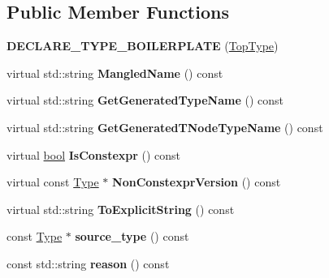 \subsection*{Public Member Functions}
\begin{DoxyCompactItemize}
\item 
\mbox{\label{classv8_1_1internal_1_1torque_1_1TopType_a4ab4da784464f2c3f13d1b2fa3656a39}} 
{\bfseries D\+E\+C\+L\+A\+R\+E\+\_\+\+T\+Y\+P\+E\+\_\+\+B\+O\+I\+L\+E\+R\+P\+L\+A\+TE} (\mbox{\hyperlink{classv8_1_1internal_1_1torque_1_1TopType}{Top\+Type}})
\item 
\mbox{\label{classv8_1_1internal_1_1torque_1_1TopType_afe6294e4d7bbfb9752502ddfdd43e6ba}} 
virtual std\+::string {\bfseries Mangled\+Name} () const
\item 
\mbox{\label{classv8_1_1internal_1_1torque_1_1TopType_a213c2f6aaedd82b1d601ed5eb48e16ab}} 
virtual std\+::string {\bfseries Get\+Generated\+Type\+Name} () const
\item 
\mbox{\label{classv8_1_1internal_1_1torque_1_1TopType_a12a04aa070d234950b048692e69a19a6}} 
virtual std\+::string {\bfseries Get\+Generated\+T\+Node\+Type\+Name} () const
\item 
\mbox{\label{classv8_1_1internal_1_1torque_1_1TopType_ad7fa159e3058bbfd616c14861a0f6600}} 
virtual \mbox{\hyperlink{classbool}{bool}} {\bfseries Is\+Constexpr} () const
\item 
\mbox{\label{classv8_1_1internal_1_1torque_1_1TopType_a2cf5c51e6e53fbb5142623a992dc127f}} 
virtual const \mbox{\hyperlink{classv8_1_1internal_1_1torque_1_1Type}{Type}} $\ast$ {\bfseries Non\+Constexpr\+Version} () const
\item 
\mbox{\label{classv8_1_1internal_1_1torque_1_1TopType_ad8dd9fbf14dcdd1ab0cdff3e532c02bd}} 
virtual std\+::string {\bfseries To\+Explicit\+String} () const
\item 
\mbox{\label{classv8_1_1internal_1_1torque_1_1TopType_a4d8b39c0932900a329455056ee997914}} 
const \mbox{\hyperlink{classv8_1_1internal_1_1torque_1_1Type}{Type}} $\ast$ {\bfseries source\+\_\+type} () const
\item 
\mbox{\label{classv8_1_1internal_1_1torque_1_1TopType_ab9788d445548613b3cdc40865191de14}} 
const std\+::string {\bfseries reason} () const
\end{DoxyCompactItemize}
